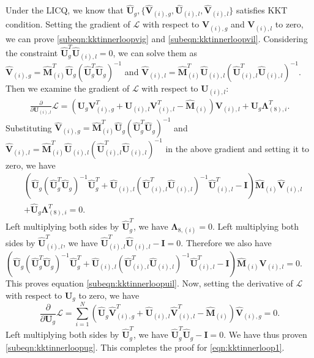 \documentclass[twoside,11pt]{article}
\newcommand{\matI}{\mathbf{I}}
\newcommand{\matLambda}{\mathbf{\Lambda}}
\newcommand{\matU}{\mathbf{U}}
\newcommand{\matV}{\mathbf{V}}
\newcommand{\hmatM}{\hat{\mathbf{M}}}
\newcommand{\hmatU}{\hat{\mathbf{U}}}
\newcommand{\hmatV}{\hat{\mathbf{V}}}
\begin{document}
Under the LICQ, we know that $\hmatU_g,\{\hmatV_{(i),g},\hmatU_{(i),l},\hmatV_{(i),l}\}$ satisfies KKT condition. Setting the gradient of $\mathcal{L}$ with respect to $\matV_{(i),g}$ and $\matV_{(i),l}$ to zero, we can prove \eqref{subeqn:kktinnerloopvig} and \eqref{subeqn:kktinnerloopvil}. Considering the constraint $\hmatU_g^T\hmatU_{(i),l}=0$, we can solve them as $\hmatV_{(i),g}=\hmatM_{(i)}^T\hmatU_{g}\left(\hmatU_{g}^T\hmatU_{g}\right)^{-1}$ and $\hmatV_{(i),l}=\hmatM_{(i)}^T\hmatU_{(i),l}\left(\hmatU_{(i),l}^T\hmatU_{(i),l}\right)^{-1}$.
Then we examine the gradient of $\mathcal{L}$ with respect to $\matU_{(i),l}$:
$$
\begin{aligned}
\frac{\partial}{\partial \matU_{(i),l}}\mathcal{L} = \left(\matU_g\matV_{(i),g}^T+\matU_{(i),l}\matV_{(i),l}^T-\hmatM_{(i)}\right)\matV_{(i),l}+\matU_g\matLambda_{(8),i}^T.
\end{aligned}
$$
Substituting  $\hmatV_{(i),g}=\hmatM_{(i)}^T\hmatU_{g}\left(\hmatU_{g}^T\hmatU_{g}\right)^{-1}$ and $\hmatV_{(i),l}=\hmatM_{(i)}^T\hmatU_{(i),l}\left(\hmatU_{(i),l}^T\hmatU_{(i),l}\right)^{-1}$ in the above gradient and setting it to zero, we have
$$
\begin{aligned}
&\left(\hmatU_g\left(\hmatU_g^T\hmatU_g\right)^{-1}\hmatU_g^T+\hmatU_{(i),l}\left(\hmatU_{(i),l}^T\hmatU_{(i),l}\right)^{-1}\hmatU_{(i),l}^T-\matI\right)\hmatM_{(i)}\hmatV_{(i),l}\\
&+\hmatU_g\matLambda_{(8),i}^T=0.
\end{aligned}
$$
Left multiplying both sides by $\hmatU_{g}^T$, we have $\matLambda_{8,(i)} = 0$. Left multiplying both sides by $\hmatU_{(i),l}^T$, we have $\hmatU_{(i),l}^T\hmatU_{(i),l}-\matI = 0$. Therefore we also have $\left(\hmatU_g\left(\hmatU_g^T\hmatU_g\right)^{-1}\hmatU_g^T+\hmatU_{(i),l}\left(\hmatU_{(i),l}^T\hmatU_{(i),l}\right)^{-1}\hmatU_{(i),l}^T-\matI\right)\hmatM_{(i)}\matV_{(i),l}=0$.
This proves equation \eqref{subeqn:kktinnerloopuil}.
Now, setting the derivative of $\mathcal{L}$ with respect to $\matU_{g}$ to zero, we have
$$
\frac{\partial}{\partial \matU_{g}}\mathcal{L}=\sum_{i=1}^N\left(\hmatU_g\hmatV_{(i),g}^T+\hmatU_{(i),l}\hmatV_{(i),l}^T-\hmatM_{(i)}\right)\hmatV_{(i),g}=0.
$$
Left multiplying both sides by $\hmatU_g^T$, we have $\hmatU_g^T\hmatU_g-\matI=0$. We have thus proven  \eqref{subeqn:kktinnerloopug}. This completes the proof for \eqref{eqn:kktinnerloop1}. 
\end{document}
